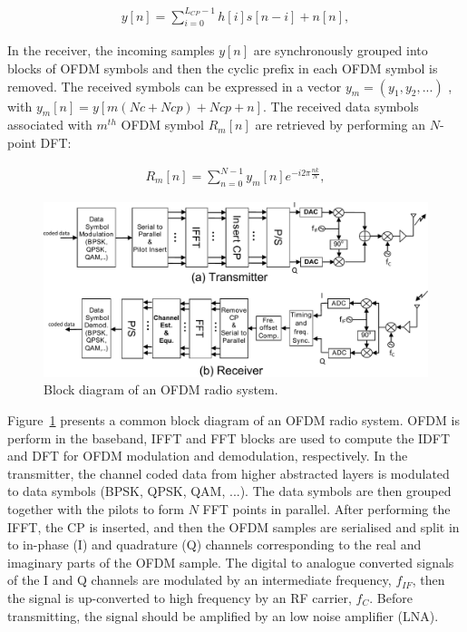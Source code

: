\begin{eqnarray}
\label{equ:OFDMchannelsignal}
y[n] =  \sum_{i=0}^{L_{CP}-1} h[i]s[n-i] + n[n],
\end{eqnarray}

In the receiver, the incoming samples $y[n]$ are synchronously grouped into blocks of OFDM symbols and then the cyclic prefix in each OFDM symbol is removed.
The received symbols can be expressed in a vector $y_{m} = (y_{1}, y_{2}, . . . )$ , with $y_{m}[n]=y[m(Nc+Ncp)+Ncp +n]$.
The received data symbols associated with $m^{th}$ OFDM symbol $R_{m}[n]$ are retrieved by performing an $N$-point DFT:

\begin{eqnarray}
\label{equ:receiveOFDMsymbol}
R_{m}[n] =  \sum_{n=0}^{N-1} y_{m}[n]e^{-i2\pi \frac{nk}{N}},
\end{eqnarray}

\begin{figure}
	\centerline{\includegraphics [width=\columnwidth] {Figures/OFDM-block.pdf} }
	\caption{Block diagram of an OFDM radio system.}
	\label{fig:OFDM-block}
\end{figure}

Figure~\ref{fig:OFDM-block} presents a common block diagram of an OFDM radio system.
OFDM is perform in the baseband, IFFT and FFT blocks are used to compute the IDFT and DFT for OFDM modulation and demodulation, respectively.
In the transmitter, the channel coded data from higher abstracted layers is modulated to data symbols (BPSK, QPSK, QAM, ...). The data symbols are then grouped together with the pilots to form $N$ FFT points in parallel.
After performing the IFFT, the CP is inserted, and then the OFDM samples are serialised and split in to in-phase (I) and quadrature (Q) channels corresponding to the real and imaginary parts of  the OFDM sample.
The digital to analogue converted signals of the I and Q channels are modulated by an intermediate frequency, $f_{IF}$, then the signal is up-converted to high frequency by an RF carrier, $f_{C}$.
Before transmitting, the signal should be amplified by an low noise amplifier (LNA).

